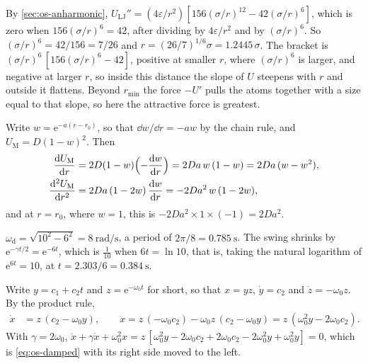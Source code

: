 By \cref{sec:os-anharmonic}, $U_{\mathrm{LJ}}'' =
(4\varepsilon/r^2)[156(\sigma/r)^{12} - 42(\sigma/r)^6]$, which is zero
when $156(\sigma/r)^6 = 42$, after dividing by $4\varepsilon/r^2$ and by
$(\sigma/r)^6$. So $(\sigma/r)^6 = 42/156 = 7/26$ and $r =
(26/7)^{1/6}\sigma = 1.2445\,\sigma$. The bracket is $(\sigma/r)^6\,
[156(\sigma/r)^6 - 42]$, positive at smaller $r$, where $(\sigma/r)^6$ is
larger, and negative at larger $r$, so inside this distance the slope of
$U$ steepens with $r$ and outside it flattens. Beyond $r_{\min}$ the force
$-U'$ pulls the atoms together with a size equal to that slope, so here
the attractive force is greatest.

Write $w = \mathrm{e}^{-a(r - r_0)}$, so that
$\dd w/\dd r = -aw$ by the chain rule, and $U_{\mathrm M} = D(1 - w)^2$.
Then
\begin{align*}
   \frac{\mathrm{d} U_{\mathrm M}}{\mathrm{d} r} &= 2D(1 - w)\Bigl(-\frac{\mathrm{d} w}{\mathrm{d} r}\Bigr)
   = 2Da\,w\,(1 - w) = 2Da\,(w - w^2) ,\\
   \frac{\mathrm{d}^2 U_{\mathrm M}}{\mathrm{d} r^2} &= 2Da\,(1 - 2w)\,\frac{\mathrm{d} w}{\mathrm{d} r}
   = -2Da^2\,w\,(1 - 2w) ,
\end{align*}
and at $r = r_0$, where $w = 1$, this is $-2Da^2\times1\times(-1) =
2Da^2$.

$\omega_{\mathrm d} = \sqrt{10^2 - 6^2} =
\SI{8}{\radian\per\second}$, a period of $2\pi/8 = \SI{0.785}{\second}$.
The swing shrinks by $\mathrm{e}^{-\gamma t/2} = \mathrm{e}^{-6t}$, which
is $\frac1{10}$ when $6t = \ln10$, that is, taking the natural logarithm
of $\mathrm{e}^{6t} = 10$, at $t = 2.303/6 = \SI{0.384}{\second}$.

Write $y = c_1 + c_2t$ and $z =
\mathrm{e}^{-\omega_0 t}$ for short, so that $x = yz$, $\dot{y} = c_2$ and
$\dot{z} = -\omega_0 z$. By the product rule,
\begin{align*}
   \dot{x} &= z\,(c_2 - \omega_0 y) , \qquad
   \ddot{x} = z\,(-\omega_0 c_2) - \omega_0 z\,(c_2 - \omega_0 y)
   = z\,(\omega_0^2 y - 2\omega_0 c_2) .
\end{align*}
With $\gamma = 2\omega_0$, $\ddot{x} + \gamma\dot{x} + \omega_0^2 x =
z\,[\omega_0^2y - 2\omega_0c_2 + 2\omega_0c_2 - 2\omega_0^2y +
\omega_0^2y] = 0$, which is \cref{eq:os-damped} with its right side
moved to the left.

